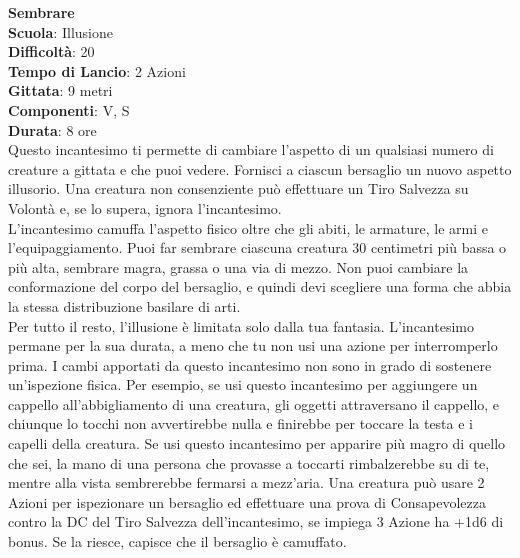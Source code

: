 \begin{multicols}{2}
\medskip\textbf{Sembrare}\\
\textbf{Scuola}: Illusione\\
\textbf{Difficoltà}: 20\\
\textbf{Tempo di Lancio}: 2 Azioni\\
\textbf{Gittata}: 9 metri\\
\textbf{Componenti}: V, S\\
\textbf{Durata}: 8 ore\\
Questo incantesimo ti permette di cambiare l'aspetto di un qualsiasi numero di creature a gittata e che puoi vedere. Fornisci a ciascun bersaglio un nuovo aspetto illusorio. Una creatura non consenziente può effettuare un Tiro Salvezza su Volontà e, se lo supera, ignora l'incantesimo.\\
L'incantesimo camuffa l'aspetto fisico oltre che gli abiti, le armature, le armi e l'equipaggiamento. Puoi far sembrare ciascuna creatura 30 centimetri più bassa o più alta, sembrare magra, grassa o una via di mezzo. Non puoi cambiare la conformazione del corpo del bersaglio, e quindi devi scegliere una forma che abbia la stessa distribuzione basilare di arti. \\
Per tutto il resto, l'illusione è limitata solo dalla tua fantasia. L'incantesimo permane per la sua durata, a meno che tu non usi una azione per interromperlo prima. I cambi apportati da questo incantesimo non sono in grado di sostenere un'ispezione fisica. Per esempio, se usi questo incantesimo per aggiungere un cappello all'abbigliamento di una creatura, gli oggetti attraversano il cappello, e chiunque lo tocchi non avvertirebbe nulla e finirebbe per toccare la testa e i capelli della creatura.
Se usi questo incantesimo per apparire più magro di quello che sei, la mano di una persona che provasse a toccarti rimbalzerebbe su di te, mentre alla vista sembrerebbe fermarsi a mezz'aria. Una creatura può usare 2 Azioni per ispezionare un bersaglio ed effettuare una prova di Consapevolezza contro la DC del Tiro Salvezza dell'incantesimo, se impiega 3 Azione ha +1d6 di bonus. Se la riesce, capisce che il bersaglio è camuffato.


\end{multicols}
